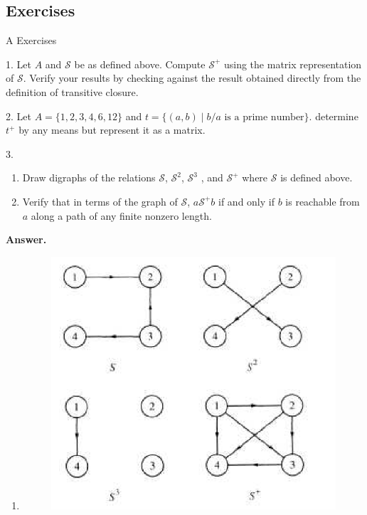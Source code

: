 \documentclass[10pt,]{book}
\theoremstyle{plain}
\theoremstyle{definition}
\theoremstyle{definition}
\theoremstyle{definition}
\theoremstyle{definition}
\begin{document}
\subsection[Exercises]{Exercises}\label{exercises-6-5}
\hypertarget{exercisegroup-10}{}\typeout{************************************************}
\typeout{************************************************}
A Exercises%
\begin{exercisegroup}
\item[1.]\hypertarget{exercise-34}{} Let \(A\) and \(\mathcal{S}\) be as defined above. Compute \(\mathcal{S}^+\) using the matrix representation of \(\mathcal{S}\). Verify your results by checking against the result obtained directly from the definition of transitive closure.%
\par\smallskip
\item[2.]\hypertarget{exercise-35}{}Let \(A=\{1,2,3,4,6,12\}\) and \(t=\{(a,b)\mid b/a \textrm{ is a prime number}\}\). determine \(t^+\) by any means but represent it as a matrix.%
\par\smallskip
\item[3.]\hypertarget{exercise-36}{}\leavevmode%
\begin{enumerate}[label=\alph*]
\item\hypertarget{li-120}{}Draw digraphs of the relations \(\mathcal{S}\), \(\mathcal{S}^2\), \(\mathcal{S}^3\) , and \(\mathcal{S}^+\)  where \(\mathcal{S}\) is defined above.%
\item\hypertarget{li-121}{} Verify that in terms of the graph of \(\mathcal{S}\), \(a \mathcal{S}^+ b\) if and only if \(b\) is reachable from \(a\) along a
path of any finite nonzero length.%
\end{enumerate}
%
\par\smallskip
\par\smallskip
\noindent\textbf{Answer.}\hypertarget{answer-18}{}\quad
\leavevmode%
\begin{enumerate}[label=\alph*]
\item\hypertarget{li-122}{}\leavevmode%
\begin{figure}
\centering
\includegraphics[width=1\linewidth]{images/fig-sol-6-5-3.png}

\end{figure}
\end{enumerate}
\end{exercisegroup}
\end{document}
